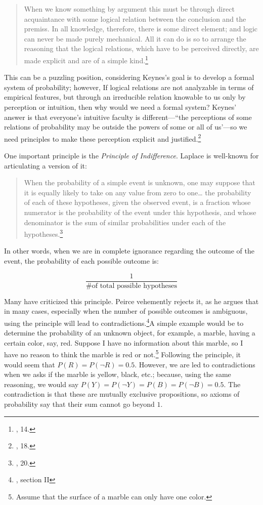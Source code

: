 \begin{quote}
When we know something by argument this must be through direct
acquaintance with some logical relation between the conclusion and the
premiss. In all knowledge, therefore, there is some direct element; and
logic can never be made purely mechanical. All it can do is so to
arrange the reasoning that the logical relations, which have to be
perceived directly, are made explicit and are of a simple
kind.\footnote{\cite{keynes}, 14.}
\end{quote}

This can be a puzzling position, considering Keynes's goal is to develop a
formal system of probability; however, If logical relations are not
analyzable in terms of empirical features, but through an irreducible relation
knowable to us only by perception or intuition, then why would we need a
formal system? Keynes' answer is that everyone's intuitive faculty is
different---``the perceptions of some relations of probability may be
outside the powers of some or all of us'---so we need principles to make
these perception explicit and justified.\footnote{\cite{keynes}, 18.}

One important principle is the \emph{Principle of Indifference}. Laplace
is well-known for articulating a version of it:

\begin{quote}
When the probability of a simple event is unknown, one may suppose that
it is equally likely to take on any value from zero to one\ldots{} the
probability of each of these hypotheses, given the observed event, is a
fraction whose numerator is the probability of the event under this hypothesis, and whose denominator is the sum of similar probabilities under each of the hypotheses.\footnote{\cite{laplace}, 20.}
\end{quote}

In other words, when we are in complete ignorance regarding the outcome
of the event, the probability of each possible outcome is:

$$\frac{1}{\text{\# of total possible hypotheses}}$$

Many have criticized this principle. Peirce vehemently
rejects it, as he argues that in many cases, especially when the number
of possible outcomes is ambiguous, using the principle will lead to
contradictions.\footnote{\cite{probabilityofinduction}, section II}A simple example would be to determine the probability of an unknown object, for example, a marble, having a certain color, say, red. Suppose I have no information about this marble, so I have no
reason to think the marble is red or not.\footnote{Assume that the surface
  of a marble can only have one color.} Following the principle, it would
seem that \(P(R) = P(\neg R) = 0.5\). However, we are led to
contradictions when we asks if the marble is yellow, black, etc.; because,
using the same reasoning, we would say
\(P(Y) = P(\neg Y) = P(B) = P(\neg B) = 0.5\). The contradiction is that
these are mutually exclusive propositions, so axioms of probability say
that their sum cannot go beyond \(1\).

